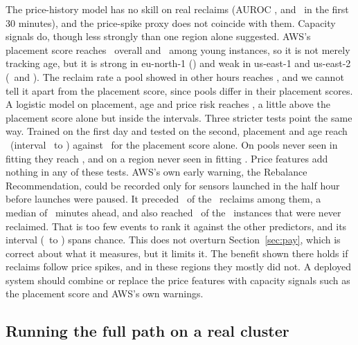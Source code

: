 \documentclass{article}
\begin{document}
The price-history model has no skill on real reclaims (AUROC \realAurocPrice, and \realYoungPrice\ in the first 30 minutes), and the price-spike proxy does not coincide with them. Capacity signals do, though less strongly than one region alone suggested. AWS's placement score reaches \realAurocPlace\ overall and \realYoungPlace\ among young instances, so it is not merely tracking age, but it is strong in eu-north-1 (\realPlaceEuNorth) and weak in us-east-1 and us-east-2 (\realPlaceUsEastOne\ and \realPlaceUsEastTwo). The reclaim rate a pool showed in other hours reaches \realAurocPrior, and we cannot tell it apart from the placement score, since pools differ in their placement scores. A logistic model on placement, age and price risk reaches \realAurocLearned, a little above the placement score alone but inside the intervals. Three stricter tests point the same way. Trained on the first day and tested on the second, placement and age reach \realFwdPlaceAge\ (interval \realFwdPlaceAgeLo\ to \realFwdPlaceAgeHi) against \realFwdPlace\ for the placement score alone. On pools never seen in fitting they reach \realByPoolPlaceAge, and on a region never seen in fitting \realRegionPlaceAge. Price features add nothing in any of these tests. \ifdefined\realAurocReb{}AWS's own early warning, the Rebalance Recommendation, could be recorded only for sensors launched in the half hour before launches were paused. It preceded \realRebWarned\ of the \realRebCovered\ reclaims among them, a median of \realRebLead\ minutes ahead, and also reached \realRebFalse\ of the \realRebUnrec\ instances that were never reclaimed. That is too few events to rank it against the other predictors, and its interval (\realLoReb\ to \realHiReb) spans chance. \fi This does not overturn Section~\ref{sec:pay}, which is correct about what it measures, but it limits it. The benefit shown there holds if reclaims follow price spikes, and in these regions they mostly did not. A deployed system should combine or replace the price features with capacity signals such as the placement score and AWS's own warnings.

\subsection{Running the full path on a real cluster}
\label{sec:eks}
\end{document}
